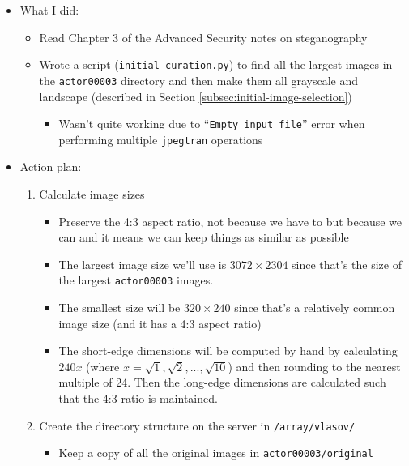 \documentclass[11pt,a4paper]{report}
\begin{document}
\begin{itemize}

\item What I did:
  \begin{itemize}
  \item Read Chapter 3 of the Advanced Security notes on steganography
  \item Wrote a script (\texttt{initial\_curation.py}) to find all the largest images in the \texttt{actor00003} directory and then make them all grayscale and landscape (described in Section \ref{subsec:initial-image-selection})
    \begin{itemize}
    \item Wasn't quite working due to ``\texttt{Empty input file}'' error when performing multiple \texttt{jpegtran} operations
    \end{itemize}
  \end{itemize}

\item Action plan:
  \begin{enumerate}

  \item Calculate image sizes
    \begin{itemize}
    \item Preserve the 4:3 aspect ratio, not because we have to but because we can and it means we can keep things as similar as possible

    \item The largest image size we'll use is $3072\times2304$ since that's the size of the largest \texttt{actor00003} images.

    \item The smallest size will be $320\times240$ since that's a relatively common image size (and it has a 4:3 aspect ratio)

    \item The short-edge dimensions will be computed by hand by calculating $240x$ (where $x=\sqrt{1}, \sqrt{2},...,\sqrt{10}$) and then rounding to the nearest multiple of 24. Then the long-edge dimensions are calculated such that the 4:3 ratio is maintained.
    \end{itemize}

  \item Create the directory structure on the server in \texttt{/array/vlasov/}
    \begin{itemize}
    \item Keep a copy of all the original images in \texttt{actor00003/original}


\end{itemize}
\end{enumerate}
\end{itemize}
\end{document}
